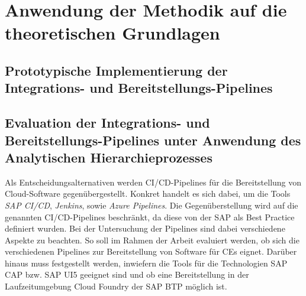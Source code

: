 \section{Anwendung der Methodik auf die theoretischen Grundlagen}

\subsection{Prototypische Implementierung der Integrations- und Bereitstellungs-Pipelines}
\subsection{Evaluation der Integrations- und Bereitstellungs-Pipelines unter Anwendung des Analytischen Hierarchieprozesses}
\label{sec:AHP}
Als Entscheidungsalternativen werden CI/CD-Pipelines für die Bereitstellung von Cloud-Software gegenübergestellt. Konkret handelt es sich dabei, um die Tools \textit{SAP CI/CD}, \textit{Jenkins}, sowie \textit{Azure Pipelines}. Die Gegenüberstellung wird auf die genannten CI/CD-Pipelines beschränkt, da diese von der SAP als Best Practice definiert wurden. Bei der Untersuchung der Pipelines sind dabei verschiedene Aspekte zu beachten. So soll im Rahmen der Arbeit evaluiert werden, ob sich die verschiedenen Pipelines zur Bereitstellung von Software für CEs eignet. Darüber hinaus muss festgestellt werden, inwiefern die Tools für die Technologien SAP CAP bzw. SAP UI5 geeignet sind und ob eine Bereitstellung in der Laufzeitumgebung Cloud Foundry der SAP BTP möglich ist. 
